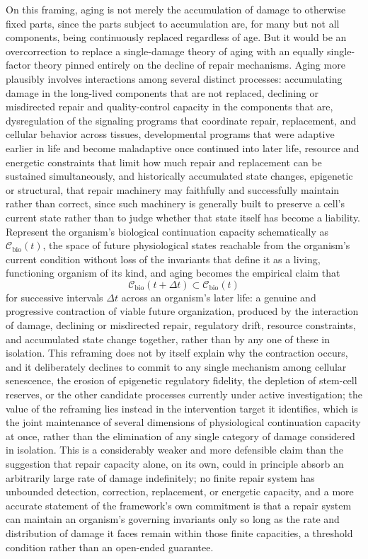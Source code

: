 \documentclass[11pt]{article}
\begin{document}
On this framing, aging is not merely the accumulation of damage to otherwise fixed parts, since the parts subject to accumulation are, for many but not all components, being continuously replaced regardless of age. But it would be an overcorrection to replace a single-damage theory of aging with an equally single-factor theory pinned entirely on the decline of repair mechanisms. Aging more plausibly involves interactions among several distinct processes: accumulating damage in the long-lived components that are not replaced, declining or misdirected repair and quality-control capacity in the components that are, dysregulation of the signaling programs that coordinate repair, replacement, and cellular behavior across tissues, developmental programs that were adaptive earlier in life and become maladaptive once continued into later life, resource and energetic constraints that limit how much repair and replacement can be sustained simultaneously, and historically accumulated state changes, epigenetic or structural, that repair machinery may faithfully and successfully maintain rather than correct, since such machinery is generally built to preserve a cell's current state rather than to judge whether that state itself has become a liability. Represent the organism's biological continuation capacity schematically as $\mathcal{C}_{\text{bio}}(t)$, the space of future physiological states reachable from the organism's current condition without loss of the invariants that define it as a living, functioning organism of its kind, and aging becomes the empirical claim that
$$\mathcal{C}_{\text{bio}}(t + \Delta t) \subset \mathcal{C}_{\text{bio}}(t)$$
for successive intervals $\Delta t$ across an organism's later life: a genuine and progressive contraction of viable future organization, produced by the interaction of damage, declining or misdirected repair, regulatory drift, resource constraints, and accumulated state change together, rather than by any one of these in isolation. This reframing does not by itself explain why the contraction occurs, and it deliberately declines to commit to any single mechanism among cellular senescence, the erosion of epigenetic regulatory fidelity, the depletion of stem-cell reserves, or the other candidate processes currently under active investigation; the value of the reframing lies instead in the intervention target it identifies, which is the joint maintenance of several dimensions of physiological continuation capacity at once, rather than the elimination of any single category of damage considered in isolation. This is a considerably weaker and more defensible claim than the suggestion that repair capacity alone, on its own, could in principle absorb an arbitrarily large rate of damage indefinitely; no finite repair system has unbounded detection, correction, replacement, or energetic capacity, and a more accurate statement of the framework's own commitment is that a repair system can maintain an organism's governing invariants only so long as the rate and distribution of damage it faces remain within those finite capacities, a threshold condition rather than an open-ended guarantee.
\end{document}
